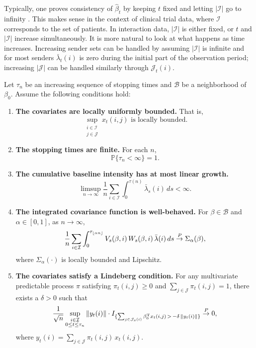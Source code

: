 \documentclass[aoas,preprint]{imsart}
\begin{document}
Typically, one proves consistency of $\hat \beta_t$ by keeping $t$ fixed
and letting $|\mathcal{I}|$ go to infinity
\cite{andersen1993statistical,cook2007statistical,fleming1991counting,
martinussen2006dynamic}.  This makes sense in the context of clinical trial
data, where $\mathcal{I}$ corresponds to the set of patients.  In interaction
data, $|\mathcal{I}|$ is either fixed, or $t$ and $|\mathcal{I}|$ increase
simultaneously.  It is more natural to look at what happens as time increases.
Increasing sender sets can be handled by assuming $|\mathcal{I}|$ is infinite
and for most senders $\bar \lambda_t(i)$ is zero during the initial
part of the observation period; increasing $|\mathcal{J}|$ can be handled
similarly through $\mathcal{J}_t(i)$.

Let $\tau_n$ be an increasing sequence of stopping times and $\mathcal{B}$ be
a neighborhood of $\beta_0$.  Assume the following conditions hold:
\begin{enumerate}[(1)]
    \item \textbf{The covariates are locally uniformly bounded.}  That is,
    \[
        \sup_{\substack{i \in \mathcal{I} \\ j \in \mathcal{J}}} x_t(i,j)
        \,\,\text{is locally bounded.}
    \]
    \item \textbf{The stopping times are finite.}  For each $n$,
    \[
        \mathbb{P}\{\tau_n < \infty\} = 1.
    \]
    \item \textbf{The cumulative baseline intensity has at most linear growth.}
    \[
        \limsup_{n\to\infty}
            \frac{1}{n} \sum_{i \in \mathcal{I}}
            \int_0^{\tau(n)} \bar \lambda_s(i) \, ds < \infty.
    \]
    \item \textbf{The integrated covariance function is well-behaved.}
    For $\beta \in \mathcal{B}$ and $\alpha \in [0,1]$, as $ n \to \infty$,
    \[
        \frac{1}{n}
        \sum_{i \in \mathcal{I}}
        \int_0^{\tau_{\lfloor \alpha n \rfloor}}
            V_s(\beta,i)
            \, W_s(\beta,i)
            \, \bar \lambda(i)
            \, ds
        \overset{\mathit{P}}{\to}
        \Sigma_\alpha(\beta),
    \]
    where $\Sigma_\alpha(\cdot)$ is locally bounded and Lipschitz.
    
    \item \textbf{The covariates satisfy a Lindeberg condition.}
    For any multivariate predictable process $\pi$ satisfying
    $\pi_t(i, j) \geq 0$ and $\sum_{j \in \mathcal{J}} \pi_t(i, j) = 1$,
    there exists a $\delta > 0$ such that 
    \[
        \frac{1}{\sqrt{n}}
            \sup_{\substack{i \in \mathcal{I} \\ 0 \leq t \leq \tau_n}}
            \| y_{t}(i) \|
            \cdot
            I_{\{
                \sum_{j \in \mathcal{J}_s(i)} \beta_0^{\mathrm{T}}  x_t(i,j)
                \,>\, -\delta \, \| y_t(i) \|
            \}}
        \overset{\mathit{P}}{\to}
        0,
    \]
    where $y_t(i) = \sum_{j \in \mathcal{J}} \pi_t(i, j) \, x_t(i,j)$.
\end{enumerate}
\end{document}
